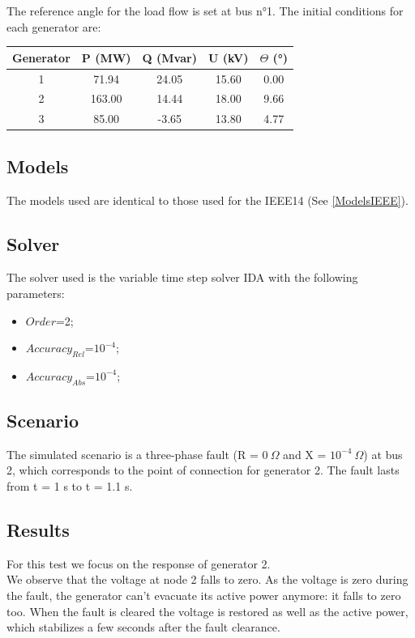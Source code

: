 \documentclass[a4paper, 12pt]{report}
\begin{document}
The reference angle for the load flow is set at bus n°1. The initial conditions for each generator
are:
\begin{center}
\begin{tabular}{|c|c|c|c|c|}
  \hline
  Generator & P (MW) & Q (Mvar) & U (kV) & $\Theta$ (°) \\
  \hline
  1 & 71.94 & 24.05 & 15.60 & 0.00\\
  2 & 163.00 & 14.44 & 18.00 & 9.66\\
  3 & 85.00 & -3.65 & 13.80 & 4.77\\
  \hline
\end{tabular}
\end{center}

\subsection{Models}

The models used are identical to those used for the IEEE14 (See \ref{ModelsIEEE}).

\subsection{Solver}
The solver used is the variable time step solver IDA with the following parameters:
\begin{itemize}
\item $Order$=2;
\item $Accuracy_{Rel}$=$10^{-4}$;
\item $Accuracy_{Abs}$=$10^{-4}$;
\end{itemize}

\subsection{Scenario}
The simulated scenario is a three-phase fault (R = $0 \ \Omega$ and X = $10^{-4} \ \Omega$) at bus 2, which corresponds to the point of connection for generator 2. The fault lasts from t = 1 s to t = 1.1 s.

\newpage
\subsection{Results}

For this test we focus on the response of generator 2.\\

We observe that the voltage at node 2 falls to zero. As the voltage is zero during the fault, the generator can't evacuate its active power anymore: it falls to zero too. When the fault is cleared the voltage is restored as well as the active power, which stabilizes a few seconds after the fault clearance.\\
\end{document}
